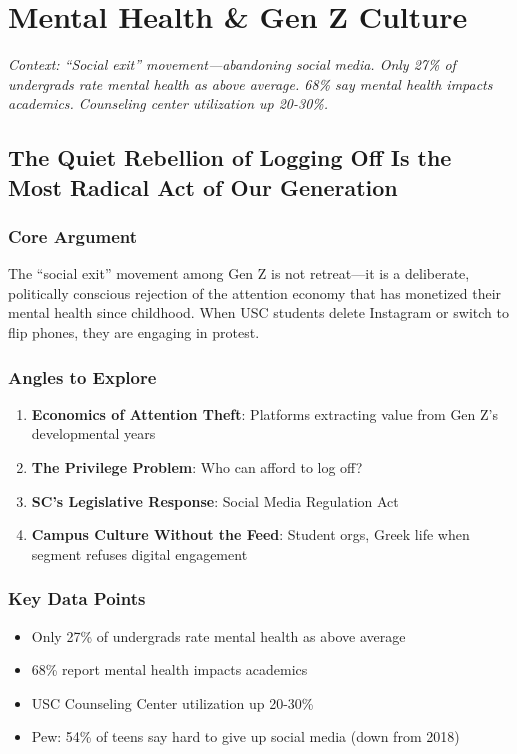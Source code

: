 \documentclass[11pt,letterpaper]{article}
\begin{document}
\newpage
\section{Mental Health \& Gen Z Culture}

\textit{Context: ``Social exit'' movement---abandoning social media. Only 27\% of undergrads rate mental health as above average. 68\% say mental health impacts academics. Counseling center utilization up 20-30\%.}

\newpage
\subsection{The Quiet Rebellion of Logging Off Is the Most Radical Act of Our Generation}

\subsubsection*{Core Argument}
The ``social exit'' movement among Gen Z is not retreat---it is a deliberate, politically conscious rejection of the attention economy that has monetized their mental health since childhood. When USC students delete Instagram or switch to flip phones, they are engaging in protest.

\subsubsection*{Angles to Explore}
\begin{enumerate}[noitemsep]
    \item \textbf{Economics of Attention Theft}: Platforms extracting value from Gen Z's developmental years
    \item \textbf{The Privilege Problem}: Who can afford to log off?
    \item \textbf{SC's Legislative Response}: Social Media Regulation Act
    \item \textbf{Campus Culture Without the Feed}: Student orgs, Greek life when segment refuses digital engagement
\end{enumerate}

\subsubsection*{Key Data Points}
\begin{itemize}[noitemsep]
    \item Only 27\% of undergrads rate mental health as above average
    \item 68\% report mental health impacts academics
    \item USC Counseling Center utilization up 20-30\%
    \item Pew: 54\% of teens say hard to give up social media (down from 2018)
\end{itemize}
\end{document}
